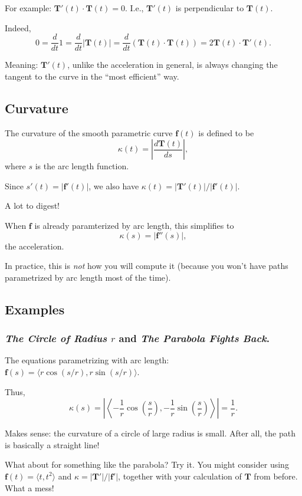 \documentclass[]{article}
\begin{document}
For example: $\mathbf T'(t)\cdot\mathbf T(t)=0.$ I.e., $\mathbf T'(t)$
is perpendicular to $\mathbf T(t)$.

Indeed, \[0=\frac{d}{dt}1=\frac{d}{dt}|\mathbf
T(t)|=\frac{d}{dt}\left(\mathbf T(t)\cdot\mathbf
T(t)\right)=2\mathbf T(t)\cdot\mathbf T'(t).\]

Meaning: $\mathbf T'(t)$, unlike the acceleration in general, is always
changing the tangent to the curve in the ``most efficient'' way.

\subsection{Curvature}\label{curvature-1}

The curvature of the smooth parametric curve $\mathbf f(t)$ is defined
to be \[\kappa(t)=\left|\frac{d\mathbf
T(t)}{ds}\right|,\] where $s$ is the arc length function.

Since $s'(t)=|\mathbf f'(t)|$, we also have
$\kappa(t)=|\mathbf T'(t)|/|\mathbf f'(t)|$.

A lot to digest!

When $\mathbf f$ is already paramterized by arc length, this simplifies
to \[\kappa(s)=|\mathbf f''(s)|,\] the acceleration.

In practice, this is \emph{not} how you will compute it (because you
won't have paths parametrized by arc length most of the time).

\subsection{Examples}\label{examples}

\subsubsection{\emph{The Circle of Radius $r$} and \emph{The Parabola
Fights
Back}.}\label{the-circle-of-radius-r-and-the-parabola-fights-back.}

The equations parametrizing with arc length:
$\mathbf f(s)=\langle r\cos(s/r),r\sin(s/r)\rangle$.

Thus, \[\kappa(s)=\left|\left\langle
-\frac{1}{r}\cos\left(\frac{s}{r}\right),
-\frac{1}{r}\sin\left(\frac{s}{r}\right)\right\rangle\right|=\frac{1}{r}.\]

Makes sense: the curvature of a circle of large radius is small. After
all, the path is basically a straight line!

What about for something like the parabola? Try it. You might consider
using $\mathbf f(t)=\langle t,t^2\rangle$ and
$\kappa=|\mathbf T'|/|\mathbf f'|$, together with your calculation of
$\mathbf T$ from before. What a mess!
\end{document}
